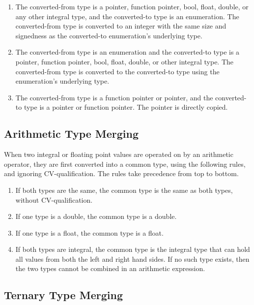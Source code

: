 \documentclass[letterpaper,12pt]{book}
\begin{document}
\begin{enumerate}
	\item The converted-from type is a pointer, function pointer, bool, float, double, or any other integral type, and the converted-to type is an enumeration. The converted-from type is converted to an integer with the same size and signedness as the converted-to enumeration's underlying type.
	
	\item The converted-from type is an enumeration and the converted-to type is a pointer, function pointer, bool, float, double, or other integral type. The converted-from type is converted to the converted-to type using the enumeration's underlying type.
	
	\item The converted-from type is a function pointer or pointer, and the converted-to type is a pointer or function pointer. The pointer is directly copied.
\end{enumerate}

\subsection{Arithmetic Type Merging}\label{subsection:Arithmetic Type Merging}

When two integral or floating point values are operated on by an arithmetic operator, they are first converted into a common type, using the following rules, and ignoring CV-qualification. The rules take precedence from top to bottom.

\begin{enumerate}
	\item If both types are the same, the common type is the same as both types, without CV-qualification.
	
	\item If one type is a double, the common type is a double.
	
	\item If one type is a float, the common type is a float.
	
	\item If both types are integral, the common type is the integral type that can hold all values from both the left and right hand sides. If no such type exists, then the two types cannot be combined in an arithmetic expression.
\end{enumerate}

\subsection{Ternary Type Merging}\label{subsection:Ternary Type Merging}
\end{document}
